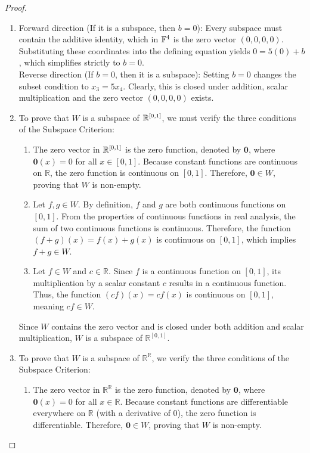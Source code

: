 \begin{proof}
	\begin{enumerate}
		\item[(a)]Forward direction (If it is a subspace, then $b = 0$): Every subspace must contain the additive identity, which in $\mathbb{F}^4$ is the zero vector $(0,0,0,0)$. Substituting these coordinates into the defining equation yields $0 = 5(0) + b$, which simplifies strictly to $b = 0$.\\
		Reverse direction (If $b = 0$, then it is a subspace): Setting $b = 0$ changes the subset condition to $x_3 = 5x_4$. Clearly, this is closed under addition, scalar multiplication and the zero vector $(0,0,0,0)$ exists.
		\item[(b)]
		To prove that $W$ is a subspace of $\mathbb{R}^{[0, 1]}$, we must verify the three conditions of the Subspace Criterion:
		\begin{enumerate}
			\item {} 
			The zero vector in $\mathbb{R}^{[0, 1]}$ is the zero function, denoted by $\mathbf{0}$, where $\mathbf{0}(x) = 0$ for all $x \in [0, 1]$. Because constant functions are continuous on $\mathbb{R}$, the zero function is continuous on $[0, 1]$. Therefore, $\mathbf{0} \in W$, proving that $W$ is non-empty.
			
			\item {} 
			Let $f, g \in W$. By definition, $f$ and $g$ are both continuous functions on $[0, 1]$. From the properties of continuous functions in real analysis, the sum of two continuous functions is continuous. Therefore, the function $(f + g)(x) = f(x) + g(x)$ is continuous on $[0, 1]$, which implies $f + g \in W$.
			
			\item {} 
			Let $f \in W$ and $c \in \mathbb{R}$. Since $f$ is a continuous function on $[0, 1]$, its multiplication by a scalar constant $c$ results in a continuous function. Thus, the function $(cf)(x) = c f(x)$ is continuous on $[0, 1]$, meaning $cf \in W$.
		\end{enumerate}
		
		Since $W$ contains the zero vector and is closed under both addition and scalar multiplication, $W$ is a subspace of $\mathbb{R}^{[0, 1]}$.
		\item[(c)]
		To prove that $W$ is a subspace of $\mathbb{R}^{\mathbb{R}}$, we verify the three conditions of the Subspace Criterion:
		\begin{enumerate}
			\item {} 
			The zero vector in $\mathbb{R}^{\mathbb{R}}$ is the zero function, denoted by $\mathbf{0}$, where $\mathbf{0}(x) = 0$ for all $x \in \mathbb{R}$. Because constant functions are differentiable everywhere on $\mathbb{R}$ (with a derivative of $0$), the zero function is differentiable. Therefore, $\mathbf{0} \in W$, proving that $W$ is non-empty.
			

\end{enumerate}
\end{enumerate}
\end{proof}
